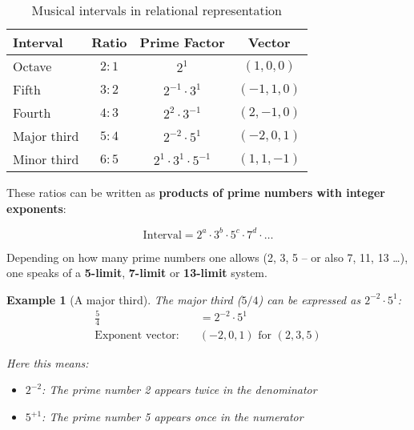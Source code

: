 \documentclass[11pt,a4paper]{article}
\newtheorem{example}{Example}[section]
\begin{document}
	\begin{table}[htbp]
		\centering
		\begin{adjustbox}{width=0.85\textwidth}
			\begin{tabular}{lccc}
				\toprule
				\textbf{Interval} & \textbf{Ratio} & \textbf{Prime Factor} & \textbf{Vector} \\
				\midrule
				Octave & $2:1$ & $2^1$ & $(1, 0, 0)$ \\
				Fifth & $3:2$ & $2^{-1} \cdot 3^1$ & $(-1, 1, 0)$ \\
				Fourth & $4:3$ & $2^2 \cdot 3^{-1}$ & $(2, -1, 0)$ \\
				Major third & $5:4$ & $2^{-2} \cdot 5^1$ & $(-2, 0, 1)$ \\
				Minor third & $6:5$ & $2^1 \cdot 3^1 \cdot 5^{-1}$ & $(1, 1, -1)$ \\
				\bottomrule
			\end{tabular}
		\end{adjustbox}
		\caption{Musical intervals in relational representation}
		\label{tab:intervalle}
	\end{table}
	
	These ratios can be written as \textbf{products of prime numbers with integer exponents}:
	
	\begin{equation}
		\text{Interval} = 2^a \cdot 3^b \cdot 5^c \cdot 7^d \cdot \ldots
	\end{equation}
	
	Depending on how many prime numbers one allows (2, 3, 5 – or also 7, 11, 13 \ldots), one speaks of a \textbf{5-limit}, \textbf{7-limit} or \textbf{13-limit} system.
	
	\begin{example}[A major third]
		The major third ($5/4$) can be expressed as $2^{-2} \cdot 5^1$:
		\begin{align}
			\frac{5}{4} &= 2^{-2} \cdot 5^1 \\
			\text{Exponent vector:} \quad &(-2, 0, 1) \text{ for } (2, 3, 5)
		\end{align}
		
		Here this means:
		\begin{itemize}
			\item $2^{-2}$: The prime number 2 appears twice in the denominator
			\item $5^{+1}$: The prime number 5 appears once in the numerator
		\end{itemize}
	\end{example}
	
\end{document}
